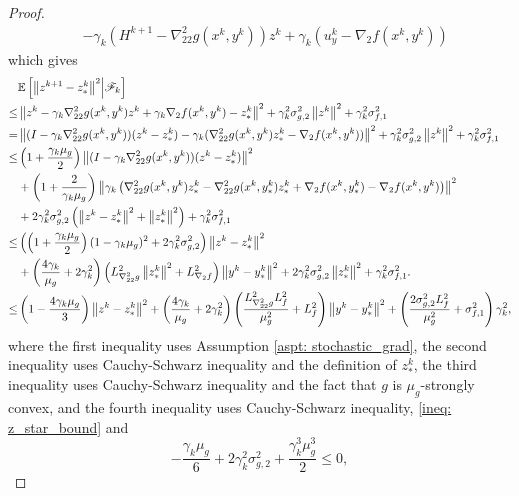 \documentclass[10pt]{article}
\theoremstyle{remark}
\def\setF{\mathscr{F}} %
\newcommand{\E}{\mathbb{E}}
\newcommand{\norm}[1]{\left\|#1\right\|}
\begin{document}
\begin{proof}
\begin{align*}
    &- \gamma_k(H^{k+1} - \nabla_{22}^2g(x^k, y^k))z^k + \gamma_k(u_{y}^k - \nabla_2 f(x^k, y^k))
\end{align*}
which gives
\begin{align}
    &\E\left[\norm{z^{k+1} - z_*^k}^2\middle|\setF_k\right] \notag\\
    \leq &\norm{z^k - \gamma_k\nabla_{22}^2g(x^k, y^k)z^k + \gamma_k\nabla_2 f(x^k, y^k) - z_*^k}^2 + \gamma_k^2\sigma_{g,2}^2\norm{z^k}^2 + \gamma_k^2\sigma_{f,1}^2 \notag\\
    = & \norm{(I - \gamma_k\nabla_{22}^2g(x^k, y^k))(z^k - z_*^k) - \gamma_k(\nabla_{22}^2g(x^k,y^k)z_*^k - \nabla_2 f(x^k, y^k))}^2 + \gamma_k^2\sigma_{g,2}^2\norm{z^k}^2 + \gamma_k^2\sigma_{f,1}^2 \notag\\
    \leq & \left(1 + \frac{\gamma_k\mu_g}{2}\right)\norm{(I - \gamma_k\nabla_{22}^2g(x^k, y^k))(z^k - z_*^k)}^2 \notag\\
    &+ \left(1 + \frac{2}{\gamma_k\mu_g}\right)\norm{\gamma_k\left(\nabla_{22}^2g(x^k,y^k)z_*^k - \nabla_{22}^2g(x^k, y_*^k)z_*^k + \nabla_2 f(x^k, y_*^k) - \nabla_2 f(x^k, y^k)\right)}^2 \notag\\
     & + 2\gamma_k^2\sigma_{g,2}^2\left(\norm{z^k - z_*^k}^2 + \norm{z_*^k}^2\right)+ \gamma_k^2\sigma_{f,1}^2 \notag\\
    \leq & \left(\left(1 + \frac{\gamma_k\mu_g}{2}\right)(1-\gamma_k\mu_g)^2 + 2\gamma_k^2\sigma_{g,2}^2\right)\norm{z^k-z_*^k}^2 \notag\\
     & + \left(\frac{4\gamma_k}{\mu_g} + 2\gamma_k^2\right)\left(L_{\nabla_{22}^2g}^2\norm{z_*^k}^2 + L_{\nabla_2 f}^2\right)\norm{y^k - y_*^k}^2 + 2\gamma_k^2\sigma_{g,2}^2\norm{z_*^k}^2 + \gamma_k^2\sigma_{f,1}^2. \notag\\
    \leq & \left(1 - \frac{4\gamma_k\mu_g}{3}\right)\norm{z^k-z_*^k}^2 + \left(\frac{4\gamma_k}{\mu_g} + 2\gamma_k^2\right)\left(\frac{L_{\nabla_{22}^2g}^2L_f^2}{\mu_g^2} + L_f ^2\right)\norm{y^k - y_*^k}^2 + \left(\frac{2\sigma_{g,2}^2L_f^2}{\mu_g^2} + \sigma_{f,1}^2\right)\gamma_k^2, \label{ineq: z_decrease_2_simple}
\end{align}
where the first inequality uses Assumption \ref{aspt: stochastic_grad}, the second inequality uses Cauchy-Schwarz inequality and the definition of $z_*^k$, the third inequality uses Cauchy-Schwarz inequality and the fact that $g$ is $\mu_g$-strongly convex, and the fourth inequality uses Cauchy-Schwarz inequality, \eqref{ineq: z_star_bound} and 
\[
    -\frac{\gamma_k\mu_g}{6} + 2\gamma_k^2\sigma_{g,2}^2 + \frac{\gamma_k^3\mu_g^3}{2}\leq 0,
\]
\end{proof}
\end{document}

